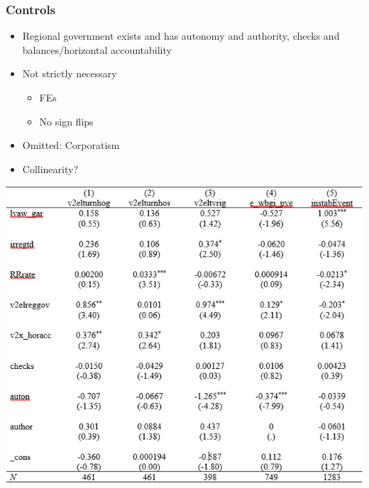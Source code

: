 \documentclass[]{beamer}
\begin{document}
\begin{frame}
    \frametitle{Controls}
    \begin{itemize}
        \item Regional government exists and has autonomy and authority, checks and balances/horizontal accountability
        \item Not strictly necessary
    \begin{itemize}
        \item FEs
        \item No sign flips
    \end{itemize}
        \item Omitted: Corporatism
        \item Collinearity?
    \end{itemize}
    \includegraphics{img0012.png}
\end{frame}
\end{document}
